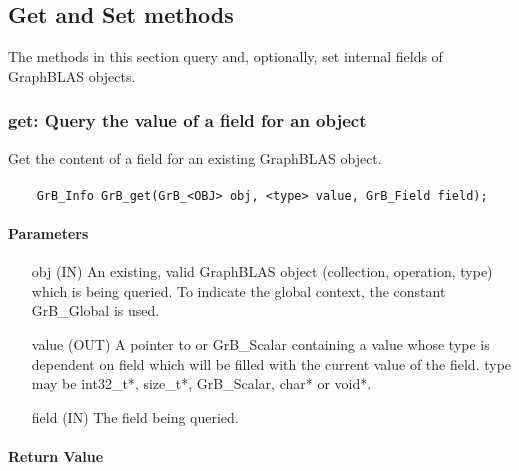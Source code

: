 \subsection{Get and Set methods}

The methods in this section query and, optionally, 
set internal fields of GraphBLAS objects.

\subsubsection{{\sf get}: Query the value of a field for an object}

Get the content of a field for an existing GraphBLAS object.

\paragraph{\syntax}

\begin{verbatim}
    GrB_Info GrB_get(GrB_<OBJ> obj, <type> value, GrB_Field field);
\end{verbatim}

\paragraph{Parameters}

\begin{itemize}[leftmargin=1.1in]
    \item[{\sf obj}] ({\sf IN}) An existing, valid GraphBLAS object (collection, operation, type) which is being queried.
                                To indicate the global context, the constant {\sf GrB\_Global} is used.
    \item[{\sf value}] ({\sf OUT}) A pointer to or {\sf GrB\_Scalar} containing a value whose type is dependent on {\sf field} which will be
                                 filled with the current value of the field. {\sf type} may be {\sf int32\_t*}, {\sf size\_t*},
                                 {\sf GrB\_Scalar}, {\sf char*} or {\sf void*}.
    \item[{\sf field}] ({\sf IN}) The field being queried.
\end{itemize}

\paragraph{Return Value}

